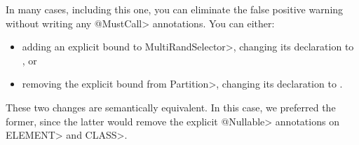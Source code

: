 In many cases, including this one, you can eliminate the false positive
warning without writing any \<@MustCall> annotations.
You can either:
\begin{itemize}
\item
  adding an explicit bound to \<MultiRandSelector>, changing its declaration to
  , or
\item removing the explicit bound from \<Partition>, changing its declaration to
  .
\end{itemize}

\noindent
These two changes are semantically equivalent.  In this case, we preferred
the former, since the latter would remove the explicit \<@Nullable>
annotations on \<ELEMENT> and \<CLASS>.


